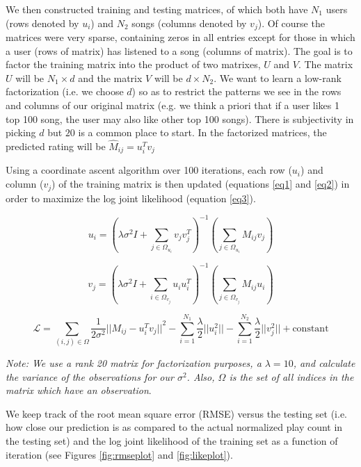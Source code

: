 \documentclass[12pt,preprint]{aastex}
\newcommand{\TRANSPOSE}{\ensuremath{T}}
\begin{document}
We then constructed training and testing matrices, of which both have $N_1$ users (rows denoted by $u_i$) and $N_2$ songs (columns denoted by $v_j$). Of course the matrices were very sparse, containing zeros in all entries except for those in which a user (rows of matrix) has listened to a song (columns of matrix). The goal is to factor the training matrix into the product of two matrixes, $U$ and $V$. The matrix $U$ will be $N_1 \times d$ and the matrix $V$ will be $d \times N_2$. We want to learn a low-rank factorization (i.e. we choose $d$) so as to restrict the patterns we see in the rows and columns of our original matrix (e.g. we think a priori that if a user likes 1 top 100 song, the user may also like other top 100 songs). There is subjectivity in picking $d$ but $20$ is a common place to start. In the factorized matrices, the predicted rating will be $\hat{M}_{ij} = u_i^\TRANSPOSE  v_j$ 

Using a coordinate ascent algorithm over 100 iterations, each row ($u_i$) and column ($v_j$) of the training matrix is then updated (equations \ref{eq1} and \ref{eq2}) in order to maximize the log joint likelihood (equation \ref{eq3}). 

\begin{equation}
u_i = \left( \lambda\sigma^2 I + \sum_{j \in \Omega_{u_i}} v_j v_j^\TRANSPOSE \right)^{-1}\left(\sum_{j \in \Omega_{u_i}} M_{ij} v_{j} \right)
\label{eq1}
\end{equation}

\begin{equation}
v_j = \left( \lambda\sigma^2 I + \sum_{i \in \Omega_{v_j}} u_i u_i^\TRANSPOSE  \right)^{-1}\left(\sum_{j \in \Omega_{v_j}} M_{ij} u_{i} \right)
\label{eq2}
\end{equation}

\begin{equation}
\mathcal{L} = \sum_{(i,j) \in \Omega} \frac{1}{2\sigma^2} {|| M_{ij} - u_i^\TRANSPOSE  v_j||}^2 - \sum_{i=1}^{N_1} \frac{\lambda}{2} ||u_i^2 || - \sum_{i=1}^{N_2} \frac{\lambda}{2} ||v_j^2 || + \text{constant}
\label{eq3} 
\end{equation}

\emph{Note: We use a rank 20 matrix for factorization purposes, a $\lambda = 10$, and calculate the variance of the observations for our $\sigma^2$. Also, $\Omega$ is the set of all indices in the matrix which have an observation}.

We keep track of the root mean square error (RMSE) versus the testing set (i.e. how close our prediction is as compared to the actual normalized play count in the testing set) and the log joint likelihood of the training set as a function of iteration (see Figures \ref{fig:rmseplot} and \ref{fig:likeplot}).
\end{document}
